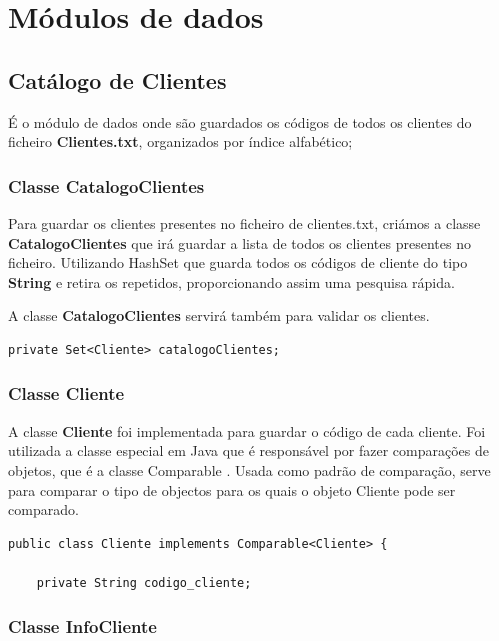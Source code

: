 \chapter{Módulos de dados}

\section{Catálogo de Clientes}
É o módulo de dados onde são guardados os códigos de todos os clientes do ficheiro \textbf{Clientes.txt}, organizados por índice alfabético;

\subsection{Classe CatalogoClientes} 

Para guardar os clientes presentes no ficheiro de clientes.txt, criámos a classe \color{blue} \textbf{CatalogoClientes} \color{black} que
irá guardar a lista de todos os clientes presentes no ficheiro. Utilizando \color{blue} HashSet \color{black} que guarda todos os códigos de cliente do tipo \color{blue} \textbf{String} \color{black} e retira os repetidos, proporcionando assim uma pesquisa rápida.

A classe \color{blue} \textbf{CatalogoClientes} \color{black} servirá também para validar os clientes.

\begin{Verbatim}
private Set<Cliente> catalogoClientes;
\end{Verbatim}


\subsection{Classe Cliente}
A classe \color{blue} \textbf{Cliente} \color{black} foi implementada para guardar o código de cada cliente. Foi utilizada a classe especial em Java que é responsável por fazer comparações de objetos, que é a classe \color{blue} Comparable \color{black}. Usada como padrão de comparação, serve para comparar o tipo de objectos para os quais o objeto  Cliente pode ser comparado. 

 

\begin{Verbatim}
public class Cliente implements Comparable<Cliente> {

	private String codigo_cliente;
\end{Verbatim}



\subsection{Classe InfoCliente}

